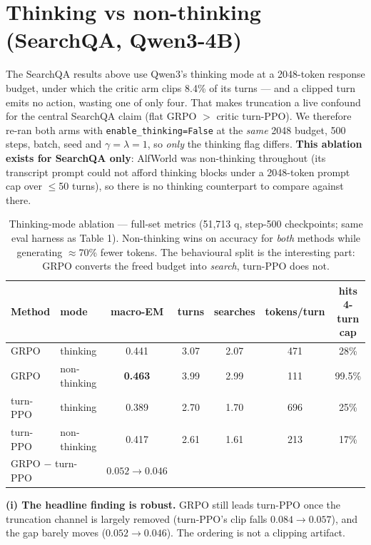 \documentclass[11pt]{article}
\newcommand{\good}[1]{\textcolor{green!45!black}{#1}}
\begin{document}
\section{Thinking vs non-thinking (SearchQA, Qwen3-4B)}
The SearchQA results above use Qwen3's thinking mode at a 2048-token response budget, under which
the critic arm clips 8.4\% of its turns --- and a clipped turn emits no action, wasting one of only
four. That makes truncation a live confound for the central SearchQA claim (flat GRPO $>$ critic
turn-PPO). We therefore re-ran both arms with \texttt{enable\_thinking=False} at the \emph{same}
2048 budget, 500 steps, batch, seed and $\gamma{=}\lambda{=}1$, so \emph{only} the thinking flag
differs. \textbf{This ablation exists for SearchQA only}: AlfWorld was non-thinking throughout (its
transcript prompt could not afford thinking blocks under a 2048-token prompt cap over $\le$50
turns), so there is no thinking counterpart to compare against there.

\begin{table}[h]\centering\small\setlength{\tabcolsep}{5pt}
\caption{Thinking-mode ablation --- full-set metrics (51{,}713 q, step-500 checkpoints; same eval
harness as Table 1). Non-thinking wins on accuracy for \emph{both} methods while generating
$\approx$70\% fewer tokens. The behavioural split is the interesting part: GRPO converts the freed
budget into \emph{search}, turn-PPO does not.}
\begin{tabular}{llccccc}
\toprule
Method & mode & macro-EM & turns & searches & tokens/turn & hits 4-turn cap\\
\midrule
GRPO      & thinking      & 0.441 & 3.07 & 2.07 & 471 & 28\%\\
GRPO      & non-thinking  & \good{\textbf{0.463}} & \good{3.99} & \good{2.99} & \good{111} & 99.5\%\\
\addlinespace
turn-PPO  & thinking      & 0.389 & 2.70 & 1.70 & 696 & 25\%\\
turn-PPO  & non-thinking  & \good{0.417} & 2.61 & 1.61 & \good{213} & 17\%\\
\midrule
\multicolumn{2}{l}{GRPO $-$ turn-PPO} & $0.052\to0.046$ & & & &\\
\bottomrule
\end{tabular}
\end{table}

\textbf{(i) The headline finding is robust.} GRPO still leads turn-PPO once the truncation channel
is largely removed (turn-PPO's clip falls $0.084\to0.057$), and the gap barely moves
($0.052\to0.046$). The ordering is not a clipping artifact.
\end{document}

